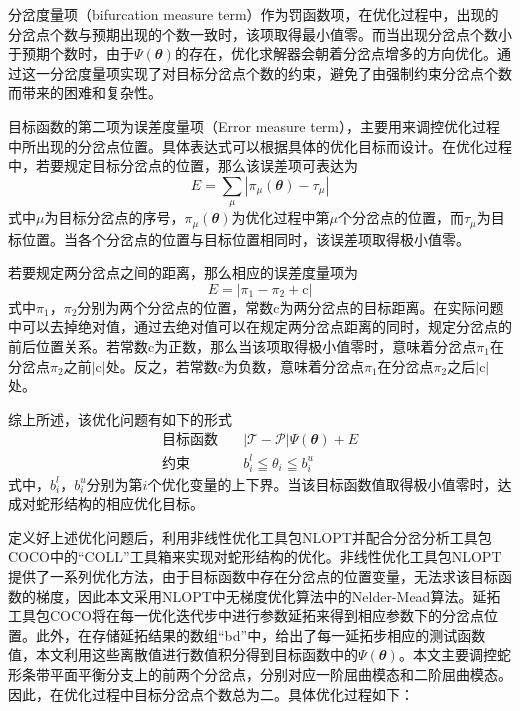 分岔度量项（bifurcation measure term）作为罚函数项，在优化过程中，出现的分岔点个数与预期出现的个数一致时，该项取得最小值零。而当出现分岔点个数小于预期个数时，由于$\Psi\left(\mathbfit{\theta} \right)$的存在，优化求解器会朝着分岔点增多的方向优化。通过这一分岔度量项实现了对目标分岔点个数的约束，避免了由强制约束分岔点个数而带来的困难和复杂性\cite{doi:10.1137/21M1418708,doi:10.1137/22M1474448}。

目标函数的第二项为误差度量项（Error measure term），主要用来调控优化过程中所出现的分岔点位置。具体表达式可以根据具体的优化目标而设计。在优化过程中，若要规定目标分岔点的位置，那么该误差项可表达为
\begin{equation}
	E=\underset{\mu}{\sum} \left|\pi_{\mu}(\mathbfit{\theta})-\tau_\mu\right|
	\label{eq:Error term1}
\end{equation}
式中$\mu$为目标分岔点的序号，$\pi_{\mu}(\mathbfit{\theta})$为优化过程中第$\mu$个分岔点的位置，而$\tau_\mu$为目标位置。当各个分岔点的位置与目标位置相同时，该误差项取得极小值零。

若要规定两分岔点之间的距离，那么相应的误差度量项为
\begin{equation}
     E=\left|\pi_{1}-\pi_{2}+\mathrm{c} \right|
	\label{eq:Error term2}
\end{equation}
式中$\pi_{1}$，$\pi_{2}$分别为两个分岔点的位置，常数$\mathrm{c}$为两分岔点的目标距离。在实际问题中可以去掉绝对值，通过去绝对值可以在规定两分岔点距离的同时，规定分岔点的前后位置关系。若常数$\mathrm{c}$为正数，那么当该项取得极小值零时，意味着分岔点${\pi_1}$在分岔点${\pi_2}$之前$\left|\mathrm{c}\right|$处。反之，若常数$\mathrm{c}$为负数，意味着分岔点${\pi_1}$在分岔点${\pi_2}$之后$\left|\mathrm{c}\right|$处。

综上所述，该优化问题有如下的形式
\begin{equation}
	\begin{split}
		\text{目标函数} \quad &\left|\mathcal{T}-\mathcal{P}\right|\Psi\left(\mathbfit{\theta} \right)+E\\
		\text{约束} \quad &b_i^l \leqq \theta_i \leqq b_i^u
	\end{split}
\end{equation}
式中，$b_i^l$，$b_i^u$分别为第$i$个优化变量的上下界。当该目标函数值取得极小值零时，达成对蛇形结构的相应优化目标。

定义好上述优化问题后，利用非线性优化工具包NLOPT\cite{NLopt,PRAXIS}并配合分岔分析工具包COCO\cite{dankowicz2013recipes}中的“COLL”工具箱来实现对蛇形结构的优化。非线性优化工具包NLOPT提供了一系列优化方法，由于目标函数中存在分岔点的位置变量，无法求该目标函数的梯度，因此本文采用NLOPT中无梯度优化算法中的Nelder-Mead算法。延拓工具包COCO将在每一优化迭代步中进行参数延拓来得到相应参数下的分岔点位置。此外，在存储延拓结果的数组“bd”中，给出了每一延拓步相应的测试函数值，本文利用这些离散值进行数值积分得到目标函数中的$\Psi\left(\mathbfit{\theta} \right)$。本文主要调控蛇形条带平面平衡分支上的前两个分岔点，分别对应一阶屈曲模态和二阶屈曲模态。因此，在优化过程中目标分岔点个数总为二。具体优化过程如下：

